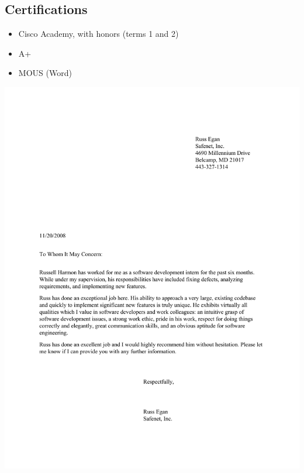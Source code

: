 \documentclass[margin]{res}
\begin{document}
\begin{resume}
\section{\textsf{Certifications}}
	\begin{itemize} \itemsep -2pt
		\item Cisco Academy, with honors (terms 1 and 2)
		\item A+
		\item MOUS (Word)
	\end{itemize}

\end{resume}
\pagebreak[4] %
\marginsize{-1.5in}{-1.5in}{-0.5in}{-0.5in}
\includegraphics{sfnt-recommendation.pdf}
\end{document}
